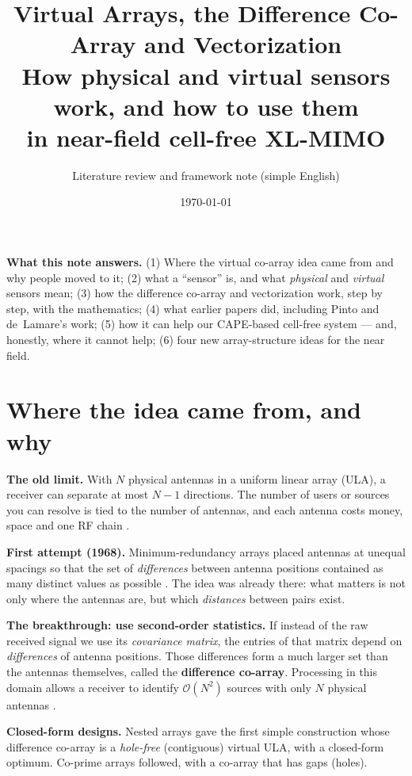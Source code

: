 \documentclass[11pt]{article}
\title{\textbf{Virtual Arrays, the Difference Co-Array and Vectorization}\\[3pt]
\large How physical and virtual sensors work, and how to use them\\ in near-field cell-free XL-MIMO}
\author{Literature review and framework note (simple English)}
\date{\today}
\begin{document}
\maketitle

\begin{keybox}
\textbf{What this note answers.}
(1) Where the virtual co-array idea came from and why people moved to it;
(2) what a ``sensor'' is, and what \emph{physical} and \emph{virtual} sensors mean;
(3) how the difference co-array and vectorization work, step by step, with the mathematics;
(4) what earlier papers did, including Pinto and de~Lamare's work;
(5) how it can help our CAPE-based cell-free system --- and, honestly, where it cannot help;
(6) four new array-structure ideas for the near field.
\end{keybox}

\section{Where the idea came from, and why}

\textbf{The old limit.} With $N$ physical antennas in a uniform linear array (ULA), a receiver can
separate at most $N-1$ directions. The number of users or sources you can resolve is tied to the
number of antennas, and each antenna costs money, space and one RF chain
\cite{vantrees2002oap}.

\textbf{First attempt (1968).} Minimum-redundancy arrays placed antennas at unequal spacings so that
the set of \emph{differences} between antenna positions contained as many distinct values as possible
\cite{moffet1968mra}. The idea was already there: what matters is not only where the antennas are,
but which \emph{distances} between pairs exist.

\textbf{The breakthrough: use second-order statistics.} If instead of the raw received signal we use
its \emph{covariance matrix}, the entries of that matrix depend on \emph{differences} of antenna
positions. Those differences form a much larger set than the antennas themselves, called the
\textbf{difference co-array}. Processing in this domain allows a receiver to identify
$\mathcal{O}(N^{2})$ sources with only $N$ physical antennas
\cite{pal2010nested,vaidyanathan2011coprime}.

\textbf{Closed-form designs.} Nested arrays \cite{pal2010nested} gave the first simple construction
whose difference co-array is a \emph{hole-free} (contiguous) virtual ULA, with a closed-form optimum.
Co-prime arrays \cite{vaidyanathan2011coprime} followed, with a co-array that has gaps (holes).
\end{document}
